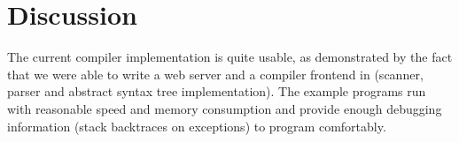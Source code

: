 



\section{Discussion}
\label{sec:impl-discussion}

The current compiler implementation is quite usable, as demonstrated
by the fact that we were able to write a web server and a \turtle{}
compiler frontend in \turtle{} (scanner, parser and abstract syntax
tree implementation).  The example programs run with reasonable speed
and memory consumption and provide enough debugging information (stack
backtraces on exceptions) to program comfortably.

